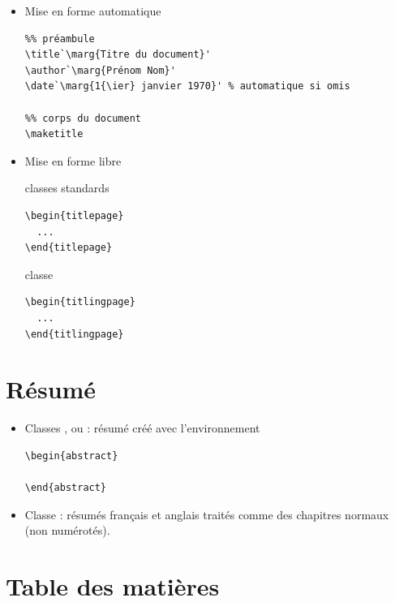 \begin{itemize}
\item Mise en forme automatique
\begin{lstlisting}
%% préambule
\title`\marg{Titre du document}'
\author`\marg{Prénom Nom}'
\date`\marg{1{\ier} janvier 1970}' % automatique si omis

%% corps du document
\maketitle
\end{lstlisting}
\item Mise en forme libre
  \begin{minipage}{0.45\linewidth}
    classes standards
\begin{lstlisting}
\begin{titlepage}
  ...
\end{titlepage}
\end{lstlisting}
  \end{minipage}
  \hfill
  \begin{minipage}{0.45\linewidth}
    classe 
\begin{lstlisting}
\begin{titlingpage}
  ...
\end{titlingpage}
\end{lstlisting}
  \end{minipage}
\end{itemize}

\section{Résumé}

\begin{itemize}
\item Classes ,  ou :
  résumé créé avec l'environnement
\begin{lstlisting}
\begin{abstract}

\end{abstract}
\end{lstlisting}
\item Classe : résumés français et anglais traités
  comme des chapitres normaux (non numérotés).
\end{itemize}


\section{Table des matières}

